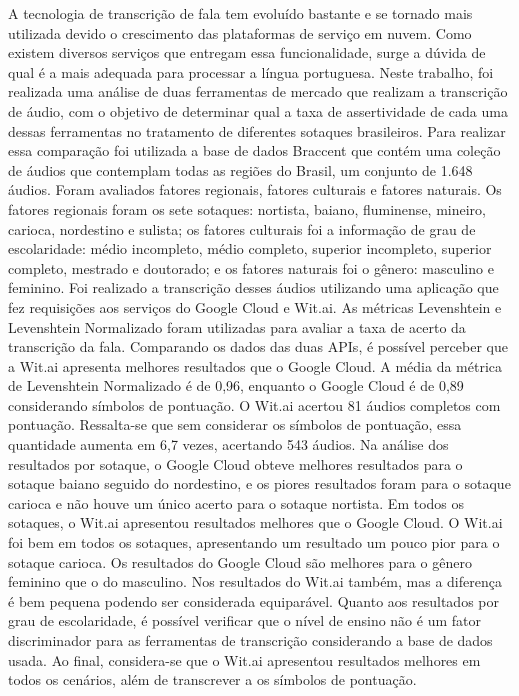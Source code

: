 \begin{resumo}[RESUMO]
\vspace*{-6mm}

A tecnologia de transcrição de fala tem evoluído bastante e se tornado mais utilizada devido o crescimento das plataformas de serviço em nuvem. Como existem diversos serviços que entregam essa funcionalidade, surge a dúvida de qual é a mais adequada para processar a língua portuguesa. Neste trabalho, foi realizada uma análise de duas ferramentas de mercado que realizam a transcrição de áudio, com o objetivo de determinar qual a taxa de assertividade de cada uma dessas ferramentas no tratamento de diferentes sotaques brasileiros. 
Para realizar essa comparação foi utilizada a base de dados Braccent que contém uma coleção de áudios que contemplam todas as regiões do Brasil, um conjunto de 1.648 áudios. Foram avaliados fatores regionais, fatores culturais e fatores naturais. Os fatores regionais foram os sete sotaques: nortista, baiano, fluminense, mineiro, carioca, nordestino e sulista; os fatores culturais foi a informação de grau de escolaridade: médio incompleto, médio completo, superior incompleto, superior completo, mestrado e doutorado; e os fatores naturais foi o gênero: masculino e feminino.  Foi realizado a transcrição desses áudios utilizando uma aplicação que fez requisições aos serviços do Google Cloud e Wit.ai. As métricas Levenshtein e Levenshtein Normalizado foram utilizadas para avaliar a taxa de acerto da transcrição da fala. 
Comparando os dados das duas APIs, é possível perceber que a Wit.ai apresenta melhores resultados que o Google Cloud. A média da métrica de Levenshtein Normalizado é de 0,96, enquanto o Google Cloud é de 0,89 considerando símbolos de pontuação. O Wit.ai acertou 81 áudios completos com pontuação. Ressalta-se que sem considerar os símbolos de pontuação, essa quantidade aumenta em 6,7 vezes, acertando 543 áudios. Na análise dos resultados por sotaque, o Google Cloud obteve melhores resultados para o sotaque baiano seguido do nordestino, e os  piores resultados foram para o sotaque carioca e não houve um único acerto para o sotaque nortista. Em todos os sotaques, o Wit.ai apresentou resultados melhores que o Google Cloud. O Wit.ai foi bem em todos os sotaques, apresentando um resultado um pouco pior para o sotaque carioca. 
Os resultados do Google Cloud são melhores para o gênero feminino que o do masculino. Nos resultados do  Wit.ai também, mas a diferença é bem pequena podendo ser  considerada equiparável. Quanto aos resultados por grau de escolaridade, é possível verificar que o nível de ensino não é um fator discriminador para as ferramentas de transcrição considerando a base de dados usada. Ao final, considera-se que o Wit.ai apresentou resultados melhores em todos os cenários, além de transcrever a os símbolos de pontuação.



\end{resumo}
